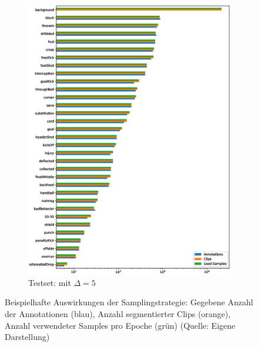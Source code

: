 \begin{figure}
\begin{subfigure}[b]{.33\textwidth}
        \includegraphics[width=.95\linewidth]{img/05_class_distribution_test_delta_5.eps}
        \caption{Testset: \newline mit $\Delta=5$}
    \end{subfigure}
    \caption[Beispielhafte Auswirkungen der Samplingstrategie]{Beispielhafte Auswirkungen der Samplingstrategie: Gegebene Anzahl der Annotationen (blau), Anzahl segmentierter Clips (orange), Anzahl verwendeter Samples pro Epoche (grün) (Quelle: Eigene Darstellung)}
    \label{fig:samples}
\end{figure}


